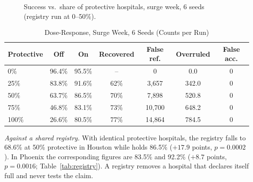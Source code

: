 \begin{figure}[!t]
\centering
{}
\caption{Success vs.\ share of protective hospitals, surge week, 6 seeds (registry run at 0--50\%).}
\label{fig:dose}
\end{figure}

\begin{table}[!t]
\centering
\caption{Dose-Response, Surge Week, 6 Seeds (Counts per Run)}
\label{tab:dose}
\scriptsize
\setlength{\tabcolsep}{2.5pt}
\begin{tabular}{@{}lcccccc@{}}
\toprule
Protective & Off & On & Recovered & False ref. & Overruled & False acc. \\
\midrule
0\%   & 96.4\% & 95.5\% & --  & 0      & 0.0   & 0 \\
25\%  & 83.8\% & 91.6\% & 62\% & 3,657 & 342.0 & 0 \\
50\%  & 63.7\% & 86.5\% & 70\% & 7,898 & 520.8 & 0 \\
75\%  & 46.8\% & 83.1\% & 73\% & 10,700 & 648.2 & 0 \\
100\% & 26.6\% & 80.5\% & 77\% & 14,864 & 784.5 & 0 \\
\bottomrule
\end{tabular}
\end{table}

\emph{Against a shared registry.} With identical protective hospitals, the registry falls to 68.6\% at 50\% protective in Houston while \mahros{} holds 86.5\% ($+17.9$ points, $p=0.0002$). In Phoenix the corresponding figures are 83.5\% and 92.2\% ($+8.7$ points, $p=0.0016$; Table~\ref{tab:registry}). A registry removes a hospital that declares itself full and never tests the claim.


